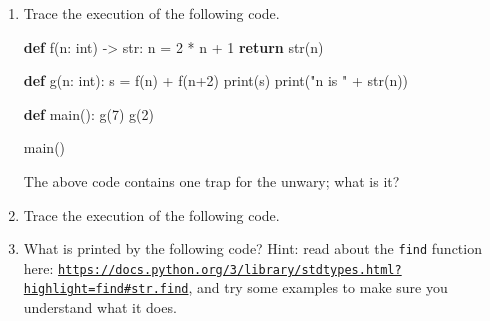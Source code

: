 \documentclass[]{article}
\newenvironment{Shaded}{}{}
\newcommand{\KeywordTok}[1]{\textcolor[rgb]{0.00,0.44,0.13}{\textbf{#1}}}
\newcommand{\DecValTok}[1]{\textcolor[rgb]{0.25,0.63,0.44}{#1}}
\newcommand{\StringTok}[1]{\textcolor[rgb]{0.25,0.44,0.63}{#1}}
\newcommand{\ControlFlowTok}[1]{\textcolor[rgb]{0.00,0.44,0.13}{\textbf{#1}}}
\newcommand{\OperatorTok}[1]{\textcolor[rgb]{0.40,0.40,0.40}{#1}}
\newcommand{\BuiltInTok}[1]{#1}
\newcommand{\NormalTok}[1]{#1}
\begin{document}
\begin{enumerate}
\def\labelenumi{\arabic{enumi}.}
\item
  Trace the execution of the following code.

\begin{Shaded}
\begin{Highlighting}[]
\KeywordTok{def}\NormalTok{ f(n: }\BuiltInTok{int}\NormalTok{) }\OperatorTok{->} \BuiltInTok{str}\NormalTok{:}
\NormalTok{    n }\OperatorTok{=} \DecValTok{2} \OperatorTok{*}\NormalTok{ n }\OperatorTok{+} \DecValTok{1}
    \ControlFlowTok{return} \BuiltInTok{str}\NormalTok{(n)}

\KeywordTok{def}\NormalTok{ g(n: }\BuiltInTok{int}\NormalTok{):}
\NormalTok{    s }\OperatorTok{=}\NormalTok{ f(n) }\OperatorTok{+}\NormalTok{ f(n}\OperatorTok{+}\DecValTok{2}\NormalTok{)}
    \BuiltInTok{print}\NormalTok{(s)}
    \BuiltInTok{print}\NormalTok{(}\StringTok{"n is "} \OperatorTok{+} \BuiltInTok{str}\NormalTok{(n))}

\KeywordTok{def}\NormalTok{ main():}
\NormalTok{    g(}\DecValTok{7}\NormalTok{)}
\NormalTok{    g(}\DecValTok{2}\NormalTok{)}

\NormalTok{main()}
\end{Highlighting}
\end{Shaded}

  The above code contains one trap for the unwary; what is it?
\item
  Trace the execution of the following code.

\begin{Shaded}
\end{Shaded}
\item
  What is printed by the following code? Hint: read about the
  \texttt{find} function here:
  \href{https://docs.python.org/3/library/stdtypes.html?highlight=find\#str.find}{\texttt{https://docs.python.org/3/library/stdtypes.html?highlight=find\#str.find}},
  and try some examples to make sure you understand what it does.


\end{enumerate}
\end{document}
